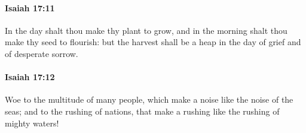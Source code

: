 		\paragraph{Isaiah 17:11} %
			\label{ISAIAH-17-11}

			In the day shalt thou make thy plant to grow, and in the morning shalt thou make thy seed to flourish: but the harvest shall be a heap in the day of grief and of desperate sorrow.


		\paragraph{Isaiah 17:12} %
			\label{ISAIAH-17-12}

			Woe to the multitude of many people, which make a noise like the noise of the seas; and to the rushing of nations, that make a rushing like the rushing of mighty waters!


